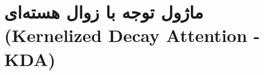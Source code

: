 \section{ماژول توجه با زوال هسته‌ای (Kernelized Decay Attention - KDA)}
\label{sec:module_kda_attention}
